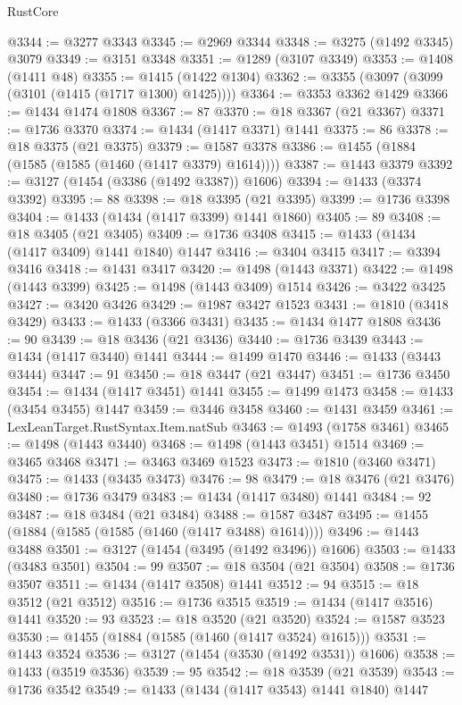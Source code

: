 \begin{lexlean}{RustCore}
\begin{coremodule}
@3344 := @3277 @3343
@3345 := @2969 @3344
@3348 := @3275 (@1492 @3345) @3079
@3349 := @3151 @3348
@3351 := @1289 (@3107 @3349)
@3353 := @1408 (@1411 @48)
@3355 := @1415 (@1422 @1304)
@3362 := @3355 (@3097 (@3099 (@3101 (@1415 (@1717 @1300) @1425))))
@3364 := @3353 @3362 @1429
@3366 := @1434 @1474 @1808
@3367 := 87
@3370 := @18 @3367 (@21 @3367)
@3371 := @1736 @3370
@3374 := @1434 (@1417 @3371) @1441
@3375 := 86
@3378 := @18 @3375 (@21 @3375)
@3379 := @1587 @3378
@3386 := @1455 (@1884 (@1585 (@1585 (@1460 (@1417 @3379) @1614))))
@3387 := @1443 @3379
@3392 := @3127 (@1454 (@3386 (@1492 @3387)) @1606)
@3394 := @1433 (@3374 @3392)
@3395 := 88
@3398 := @18 @3395 (@21 @3395)
@3399 := @1736 @3398
@3404 := @1433 (@1434 (@1417 @3399) @1441 @1860)
@3405 := 89
@3408 := @18 @3405 (@21 @3405)
@3409 := @1736 @3408
@3415 := @1433 (@1434 (@1417 @3409) @1441 @1840) @1447
@3416 := @3404 @3415
@3417 := @3394 @3416
@3418 := @1431 @3417
@3420 := @1498 (@1443 @3371)
@3422 := @1498 (@1443 @3399)
@3425 := @1498 (@1443 @3409) @1514
@3426 := @3422 @3425
@3427 := @3420 @3426
@3429 := @1987 @3427 @1523
@3431 := @1810 (@3418 @3429)
@3433 := @1433 (@3366 @3431)
@3435 := @1434 @1477 @1808
@3436 := 90
@3439 := @18 @3436 (@21 @3436)
@3440 := @1736 @3439
@3443 := @1434 (@1417 @3440) @1441
@3444 := @1499 @1470
@3446 := @1433 (@3443 @3444)
@3447 := 91
@3450 := @18 @3447 (@21 @3447)
@3451 := @1736 @3450
@3454 := @1434 (@1417 @3451) @1441
@3455 := @1499 @1473
@3458 := @1433 (@3454 @3455) @1447
@3459 := @3446 @3458
@3460 := @1431 @3459
@3461 := LexLeanTarget.RustSyntax.Item.natSub
@3463 := @1493 (@1758 @3461)
@3465 := @1498 (@1443 @3440)
@3468 := @1498 (@1443 @3451) @1514
@3469 := @3465 @3468
@3471 := @3463 @3469 @1523
@3473 := @1810 (@3460 @3471)
@3475 := @1433 (@3435 @3473)
@3476 := 98
@3479 := @18 @3476 (@21 @3476)
@3480 := @1736 @3479
@3483 := @1434 (@1417 @3480) @1441
@3484 := 92
@3487 := @18 @3484 (@21 @3484)
@3488 := @1587 @3487
@3495 := @1455 (@1884 (@1585 (@1585 (@1460 (@1417 @3488) @1614))))
@3496 := @1443 @3488
@3501 := @3127 (@1454 (@3495 (@1492 @3496)) @1606)
@3503 := @1433 (@3483 @3501)
@3504 := 99
@3507 := @18 @3504 (@21 @3504)
@3508 := @1736 @3507
@3511 := @1434 (@1417 @3508) @1441
@3512 := 94
@3515 := @18 @3512 (@21 @3512)
@3516 := @1736 @3515
@3519 := @1434 (@1417 @3516) @1441
@3520 := 93
@3523 := @18 @3520 (@21 @3520)
@3524 := @1587 @3523
@3530 := @1455 (@1884 (@1585 (@1460 (@1417 @3524) @1615)))
@3531 := @1443 @3524
@3536 := @3127 (@1454 (@3530 (@1492 @3531)) @1606)
@3538 := @1433 (@3519 @3536)
@3539 := 95
@3542 := @18 @3539 (@21 @3539)
@3543 := @1736 @3542
@3549 := @1433 (@1434 (@1417 @3543) @1441 @1840) @1447

\end{coremodule}
\end{lexlean}
